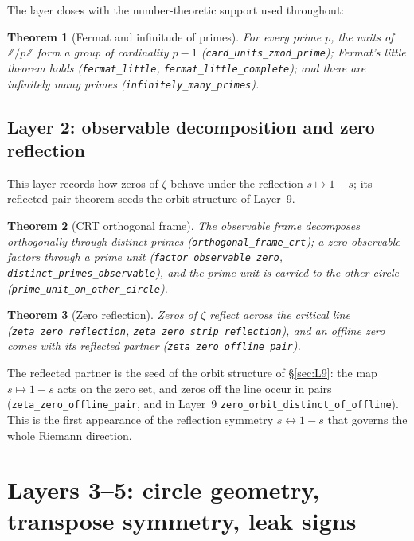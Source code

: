 \documentclass{article}
\newtheorem{theorem}{Theorem}[section]
\newcommand{\Z}{\mathbb{Z}}
\newcommand{\zt}{\zeta}
\begin{document}
The layer closes with the number-theoretic support used throughout:

\begin{theorem}[Fermat and infinitude of primes]
\label{thm:fermat}
For every prime $p$, the units of $\Z/p\Z$ form a group of cardinality
$p-1$ (\texttt{card\_units\_zmod\_prime}); Fermat's little theorem holds
(\texttt{fermat\_little}, \texttt{fermat\_little\_complete}); and there are
infinitely many primes (\texttt{infinitely\_many\_primes}).
\end{theorem}

\subsection{Layer 2: observable decomposition and zero reflection}
\label{sec:L2}

This layer records how zeros of $\zt$ behave under the reflection
$s\mapsto 1-s$; its reflected-pair theorem seeds the orbit structure of
Layer~9.

\begin{theorem}[CRT orthogonal frame]
\label{thm:crt}
The observable frame decomposes orthogonally through distinct primes
(\texttt{orthogonal\_frame\_crt}); a zero observable factors through a prime
unit (\texttt{factor\_observable\_zero},
\texttt{distinct\_primes\_observable}), and the prime unit is carried to the
other circle (\texttt{prime\_unit\_on\_other\_circle}).
\end{theorem}

\begin{theorem}[Zero reflection]
\label{thm:reflect}
Zeros of $\zt$ reflect across the critical line
(\texttt{zeta\_zero\_reflection}, \texttt{zeta\_zero\_strip\_reflection}),
and an offline zero comes with its reflected partner
(\texttt{zeta\_zero\_offline\_pair}).
\end{theorem}

The reflected partner is the seed of the orbit structure of
\S\ref{sec:L9}: the map $s\mapsto 1-s$ acts on the zero set, and zeros off
the line occur in pairs (\texttt{zeta\_zero\_offline\_pair}, and in
Layer~9 \texttt{zero\_orbit\_distinct\_of\_offline}). This is the first
appearance of the reflection
symmetry $s\leftrightarrow 1-s$ that governs the whole Riemann direction.

\section{Layers 3--5: circle geometry, transpose symmetry, leak signs}
\label{sec:L3}
\end{document}
